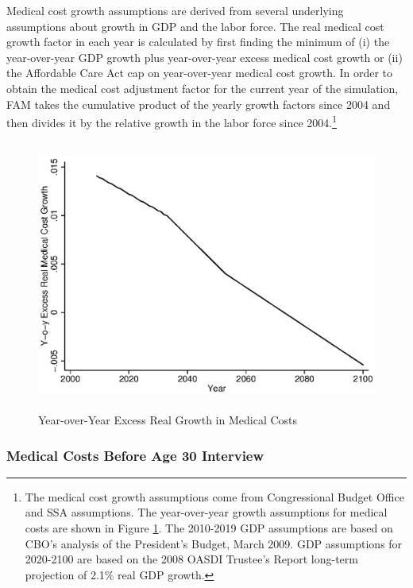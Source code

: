 \noindent Medical cost growth assumptions are derived from several underlying assumptions about growth in GDP and the labor force. The real medical cost growth factor in each year is calculated by first finding the minimum of (i) the year-over-year GDP growth plus year-over-year excess medical cost growth or (ii) the Affordable Care Act cap on year-over-year medical cost growth. In order to obtain the medical cost adjustment factor for the current year of the simulation, FAM takes the cumulative product of the yearly growth factors since 2004 and then divides it by the relative growth in the labor force since 2004.\footnote{The medical cost growth assumptions come from Congressional Budget Office and SSA assumptions.
The year-over-year growth assumptions for medical costs are shown in Figure \ref{figure:medgrowth_yearly}.
The 2010-2019 GDP assumptions are based on CBO's analysis of the President's Budget, March 2009.
GDP assumptions for 2020-2100 are based on the 2008 OASDI Trustee's Report long-term projection of 2.1\% real GDP growth.}

\begin{figure}
\caption{Year-over-Year Excess Real Growth in Medical Costs} \label{figure:medgrowth_yearly}
 \centering
	 \includegraphics[height=3.5in]{AppOutput/Health/medgrowth_yearly}
\end{figure}

\subsubsection{Medical Costs Before Age 30 Interview}
\label{appendix:health-costs-before-age30}

